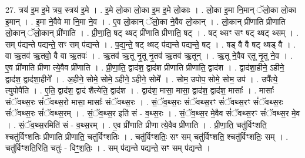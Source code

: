\documentclass[17pt]{extarticle}
\begin{document}
27. त्रय॑ इ॒म इ॒मे त्रय॒ स्त्रय॑ इ॒मे । . इ॒मे लो॒का लो॒का इ॒म इ॒मे लो॒काः । . लो॒का इ॒मा नि॒मान् ॅलो॒का लो॒का इ॒मान् । . इ॒मा ने॒वैवे मा नि॒मा ने॒व । . ए॒व लो॒कान् ॅलो॒का ने॒वैव लो॒कान् । . लो॒कान् प्री॑णाति प्रीणाति लो॒कान् ॅलो॒कान् प्री॑णाति । . प्री॒णा॒ति॒ षट् थ्षट् प्री॑णाति प्रीणाति॒ षट् । . षट् थ्सꣳ सꣳ षट् थ्षट् थ्सम् । . सम् प॑द्यन्ते पद्यन्ते॒ सꣳ सम् प॑द्यन्ते । . प॒द्य॒न्ते॒ षट् थ्षट् प॑द्यन्ते पद्यन्ते॒ षट् । . षड् वै वै षट् थ्षड् वै । . वा ऋ॒तव॑ ऋ॒तवो॒ वै वा ऋ॒तवः॑ । . ऋ॒तव॑ ऋ॒तू नृ॒तू नृ॒तव॑ ऋ॒तव॑ ऋ॒तून् । . ऋ॒तू ने॒वैव र्‌तू नृ॒तू ने॒व । . ए॒व प्री॑णाति प्रीणा त्ये॒वैव प्री॑णाति । . प्री॒णा॒ति॒ द्वाद॑श॒ द्वाद॑श प्रीणाति प्रीणाति॒ द्वाद॑श । . द्वाद॑शा॒हीने॒ ऽहीने॒ द्वाद॑श॒ द्वाद॑शा॒हीने᳚ । . अ॒हीने॒ सोमे॒ सोमे॒ ऽहीने॒ ऽहीने॒ सोमे᳚ । . सोम॒ उपोप॒ सोमे॒ सोम॒ उप॑ । . उपै᳚त्ये॒ त्युपोपै॑ति । . ए॒ति॒ द्वाद॑श॒ द्वाद॑ शैत्येति॒ द्वाद॑श । . द्वाद॑श॒ मासा॒ मासा॒ द्वाद॑श॒ द्वाद॑श॒ मासाः᳚ । . मासाः᳚ संॅवथ्स॒रः सं॑ॅवथ्स॒रो मासा॒ मासाः᳚ संॅवथ्स॒रः । . सं॒ॅव॒थ्स॒रः सं॑ॅवथ्स॒रꣳ सं॑ॅवथ्स॒रꣳ सं॑ॅवथ्स॒रः सं॑ॅवथ्स॒रः सं॑ॅवथ्स॒रम् । . सं॒ॅव॒थ्स॒र इति॑ सं - व॒थ्स॒रः । . सं॒ॅव॒थ्स॒र मे॒वैव सं॑ॅवथ्स॒रꣳ सं॑ॅवथ्स॒र मे॒व । . सं॒ॅव॒थ्स॒रमिति॑ सं - व॒थ्स॒रम् । . ए॒व प्री॑णाति प्रीणा त्ये॒वैव प्री॑णाति । . प्री॒णा॒ति॒ चतु॑र्विꣳशति॒ श्चतु॑र्विꣳशतिः प्रीणाति प्रीणाति॒ चतु॑र्विꣳशतिः । . चतु॑र्विꣳशतिः॒ सꣳ सम् चतु॑र्विꣳशति॒ श्चतु॑र्विꣳशतिः॒ सम् । . चतु॑र्विꣳशति॒रिति॒ चतुः॑ - विꣳ॒॒श॒तिः॒ । . सम् प॑द्यन्ते पद्यन्ते॒ सꣳ सम् प॑द्यन्ते । \newline
\end{document}
